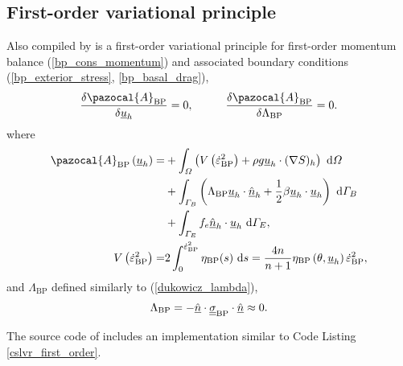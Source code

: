 \subsection{First-order variational principle} \label{ssn_first_order_var_prin}

Also compiled by \citet{dukowicz_2011} is a first-order variational principle for first-order momentum balance (\ref{bp_cons_momentum}) and associated boundary conditions (\ref{bp_exterior_stress}, \ref{bp_basal_drag}),
\begin{align}
  \label{bp_extremum}
  \frac{\delta \pazocal{A}_{\text{BP}}}{\delta \rankone{u}_h} = 0, \hspace{10mm} \frac{\delta \pazocal{A}_{\text{BP}}}{\delta \Lambda_{\text{BP}}} = 0.
\end{align}
where
\begin{align}
  \label{bp_action}
  \pazocal{A}_{\text{BP}} \left(\rankone{u}_h \right) = &+ \int_{\Omega} \left( V\left( \dot{\varepsilon}_{\text{BP}}^2 \right) + \rho g \rankone{u}_h \cdot (\nabla S)_h \right) \d{\Omega} \notag \\
  &+ \int_{\Gamma_B} \left( \Lambda_{\text{BP}} \rankone{u}_h \cdot \normal_h + \frac{1}{2} \beta \rankone{u}_h \cdot \rankone{u}_h \right) \d{\Gamma_B} \notag \\
  &+ \int_{\Gamma_E} f_e \normal_h \cdot \rankone{u}_h \d{\Gamma_E}, \\
  \label{bp_viscous_dissipation}
  V\left( \dot{\varepsilon}_{\text{BP}}^2 \right) = & 2 \int_0^{\dot{\varepsilon}_{\text{BP}}^2} \eta_{\text{BP}}(s) \d{s} = \frac{4n}{n+1} \eta_{\text{BP}}\left(\theta, \rankone{u}_h \right) \dot{\varepsilon}_{\text{BP}}^2,
\end{align}
and $\Lambda_{\text{BP}}$ defined similarly to (\ref{dukowicz_lambda}),
\begin{align}
  \label{bp_dukowicz_lambda}
  \Lambda_{\text{BP}} = - \underline{\hat{n}} \cdot \underline{\underline{\sigma}}_{\text{BP}} \cdot \underline{\hat{n}} \approx 0.
\end{align}

The source code of \CSLVR includes an implementation similar to Code Listing \ref{cslvr_first_order}.

